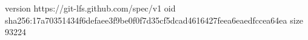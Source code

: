 version https://git-lfs.github.com/spec/v1
oid sha256:17a70351434f6defaee3f9be0f0f7d35cf5dcad4616427feea6eaedfccea64ea
size 93224
